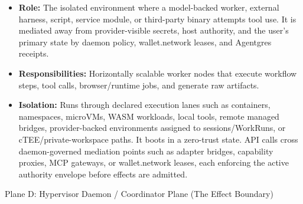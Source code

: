 \documentclass[
  11pt,
]{article}
\providecommand{\tightlist}{%
  \setlength{\itemsep}{0pt}\setlength{\parskip}{0pt}}
\begin{document}
\begin{itemize}
\tightlist
\item
  \textbf{Role:} The isolated environment where a model-backed worker,
  external harness, script, service module, or third-party binary
  attempts tool use. It is mediated away from provider-visible secrets,
  host authority, and the user's primary state by daemon policy,
  wallet.network leases, and Agentgres receipts.
\item
  \textbf{Responsibilities:} Horizontally scalable worker nodes that
  execute workflow steps, tool calls, browser/runtime jobs, and generate
  raw artifacts.
\item
  \textbf{Isolation:} Runs through declared execution lanes such as
  containers, namespaces, microVMs, WASM workloads, local tools, remote
  managed bridges, provider-backed environments assigned to sessions/WorkRuns,
  or cTEE/private-workspace paths. It
  boots in a zero-trust state. API calls cross daemon-governed mediation
  points such as adapter bridges, capability proxies, MCP gateways, or
  wallet.network leases, each enforcing the active authority envelope before
  effects are admitted.
\end{itemize}

Plane D: Hypervisor Daemon / Coordinator Plane (The Effect Boundary)
\end{document}
